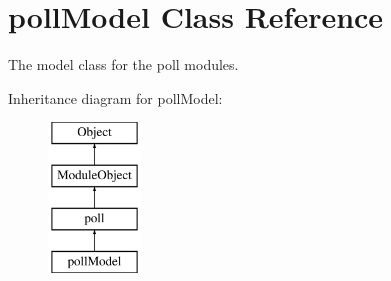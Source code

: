 \hypertarget{classpollModel}{}\section{poll\+Model Class Reference}
\label{classpollModel}


The model class for the poll modules.  


Inheritance diagram for poll\+Model\+:\begin{figure}[H]
\begin{center}
\leavevmode
\includegraphics[height=4.000000cm]{classpollModel}
\end{center}
\end{figure}
